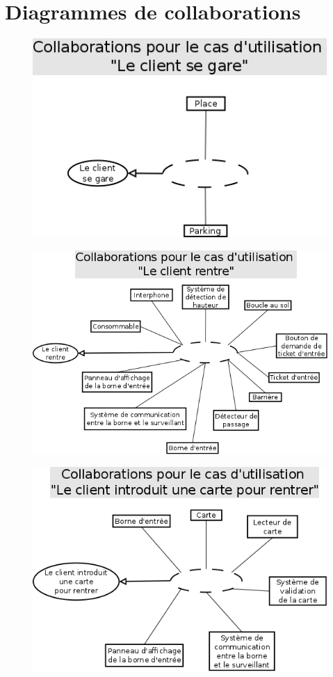 \documentclass[a4paper]{article}
\begin{document}
\section{Diagrammes de collaborations}
\begin{figure}[!ht]
\centering
\includegraphics[scale=.5]{collaborations/_gare.png}
\end{figure}
\begin{figure}[!ht]
\centering
\includegraphics[scale=.5]{collaborations/_rentre.png}
\end{figure}
\begin{figure}[!ht]
\centering
\includegraphics[scale=.5]{collaborations/_carte_entree.png}
\end{figure}
\end{document}
